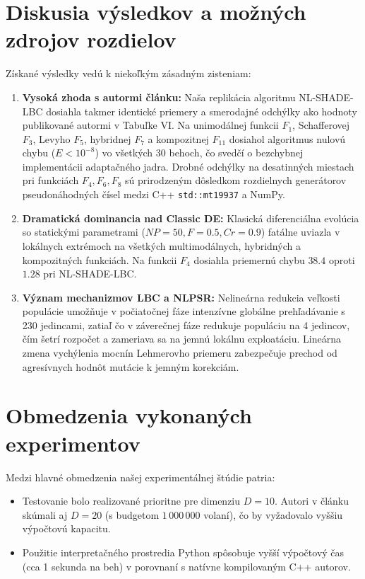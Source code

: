 \documentclass[11pt,a4paper]{article}
\begin{document}
\section{Diskusia výsledkov a možných zdrojov rozdielov}
Získané výsledky vedú k niekoľkým zásadným zisteniam:
\begin{enumerate}
    \item \textbf{Vysoká zhoda s autormi článku:} Naša replikácia algoritmu NL-SHADE-LBC dosiahla takmer identické priemery a smerodajné odchýlky ako hodnoty publikované autormi v Tabuľke VI. Na unimodálnej funkcii $F_1$, Schafferovej $F_3$, Levyho $F_5$, hybridnej $F_7$ a kompozitnej $F_{11}$ dosiahol algoritmus nulovú chybu ($E < 10^{-8}$) vo všetkých 30 behoch, čo svedčí o bezchybnej implementácii adaptačného jadra. Drobné odchýlky na desatinných miestach pri funkciách $F_4, F_6, F_8$ sú prirodzeným dôsledkom rozdielnych generátorov pseudonáhodných čísel medzi C++ \texttt{std::mt19937} a NumPy.
    \item \textbf{Dramatická dominancia nad Classic DE:} Klasická diferenciálna evolúcia so statickými parametrami ($NP=50, F=0.5, Cr=0.9$) fatálne uviazla v lokálnych extrémoch na všetkých multimodálnych, hybridných a kompozitných funkciách. Na funkcii $F_4$ dosiahla priemernú chybu $38.4$ oproti $1.28$ pri NL-SHADE-LBC.
    \item \textbf{Význam mechanizmov LBC a NLPSR:} Nelineárna redukcia veľkosti populácie umožňuje v počiatočnej fáze intenzívne globálne prehľadávanie s 230 jedincami, zatiaľ čo v záverečnej fáze redukuje populáciu na 4 jedincov, čím šetrí rozpočet a zameriava sa na jemnú lokálnu exploatáciu. Lineárna zmena vychýlenia mocnín Lehmerovho priemeru zabezpečuje prechod od agresívnych hodnôt mutácie k jemným korekciám.
\end{enumerate}

\section{Obmedzenia vykonaných experimentov}
Medzi hlavné obmedzenia našej experimentálnej štúdie patria:
\begin{itemize}
    \item Testovanie bolo realizované prioritne pre dimenziu $D=10$. Autori v článku skúmali aj $D=20$ (s budgetom $1\,000\,000$ volaní), čo by vyžadovalo vyššiu výpočtovú kapacitu.
    \item Použitie interpretačného prostredia Python spôsobuje vyšší výpočtový čas (cca 1 sekunda na beh) v porovnaní s natívne kompilovaným C++ autorov.
\end{itemize}
\end{document}
